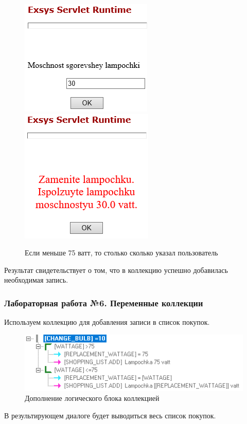 \documentclass[14pt,a4paper,report]{report}
\begin{document}
\begin{figure}[ht!]
	\includegraphics[width=.40\textwidth]{images/5_4.png}\hfill
	\includegraphics[width=.45\textwidth]{images/5_5.png}
	\caption{Если меньше 75 ватт, то столько сколько указал пользователь}
\end{figure}

Результат свидетельствует о том, что в коллекцию успешно добавилась необходимая запись.

\subsubsection{Лабораторная работа №6. Переменные коллекции}

Используем коллекцию для добавления записи в список покупок. 

\begin{figure}[h!]
	\centering
	\includegraphics[scale = 1.1]{images/6_1.png}
	\caption{Дополнение логического блока коллекцией}
\end{figure}

В результирующем диалоге будет выводиться весь список покупок.
\end{document}
